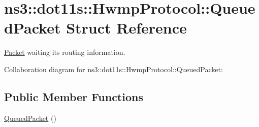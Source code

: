 \hypertarget{structns3_1_1dot11s_1_1HwmpProtocol_1_1QueuedPacket}{}\section{ns3\+:\+:dot11s\+:\+:Hwmp\+Protocol\+:\+:Queued\+Packet Struct Reference}
\label{structns3_1_1dot11s_1_1HwmpProtocol_1_1QueuedPacket}


\hyperlink{classns3_1_1Packet}{Packet} waiting its routing information.  




Collaboration diagram for ns3\+:\+:dot11s\+:\+:Hwmp\+Protocol\+:\+:Queued\+Packet\+:
\subsection*{Public Member Functions}
\begin{DoxyCompactItemize}
\item 
\hyperlink{structns3_1_1dot11s_1_1HwmpProtocol_1_1QueuedPacket_a7795fb640cb0011dacb78e795eafc168}{Queued\+Packet} ()
\end{DoxyCompactItemize}
